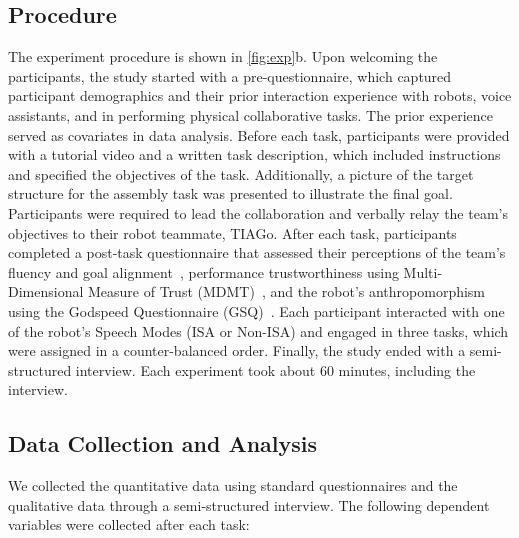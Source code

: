 \subsection{Procedure}
The experiment procedure is shown in \autoref{fig:exp}b. Upon welcoming the participants, the study started with a pre-questionnaire, which captured participant demographics and their prior interaction experience with robots, voice assistants, and in performing physical collaborative tasks. The prior experience served as covariates in data analysis. Before each task, participants were provided with a tutorial video and a written task description, which included instructions and specified the objectives of the task. Additionally, a picture of the target structure for the assembly task was presented to illustrate the final goal. 
Participants were required to lead the collaboration and verbally relay the team's objectives to their robot teammate, TIAGo. After each task, participants completed a post-task questionnaire that assessed their perceptions of the team's fluency and goal alignment~\cite{hoffman2010effects}, performance trustworthiness using Multi-Dimensional Measure of Trust (MDMT)~\cite{malle2021multidimensional}, and the robot's anthropomorphism using the Godspeed Questionnaire (GSQ)~\cite{bartneck2023godspeed}. Each participant interacted with one of the robot's Speech Modes (ISA or Non-ISA) and engaged in three tasks, which were assigned in a counter-balanced order. Finally, the study ended with a semi-structured interview. Each experiment took about 60 minutes, including the interview.

\subsection{Data Collection and Analysis}
We collected the quantitative data using standard questionnaires and the qualitative data through a semi-structured interview. The following dependent variables were collected after each task:

